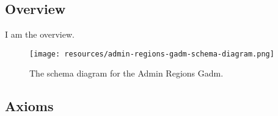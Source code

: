 \subsection{Overview}
\label{ssec:overview}

I am the overview.

\begin{figure}[h!]
  \begin{center}
    \texttt{[image: resources/admin-regions-gadm-schema-diagram.png]}
  \end{center}
  \caption{The schema diagram for the Admin Regions Gadm.}
  \label{fig:ov-diagram}
\end{figure}


\subsection{Axioms}
